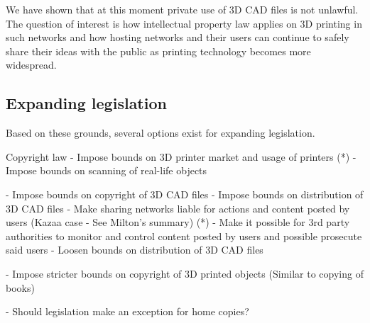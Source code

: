 We have shown that at this moment private use of 3D CAD files is not unlawful.
The question of interest is how intellectual property law applies on 3D printing
 in such networks and how hosting networks and their users can continue to 
 safely share their ideas with the public as printing technology becomes more 
widespread.

\subsection{Expanding legislation}
Based on these grounds, several options exist for expanding legislation.

Copyright law
- Impose bounds on 3D printer market and usage of printers (*)
- Impose bounds on scanning of real-life objects

- Impose bounds on copyright of 3D CAD files 
- Impose bounds on distribution of 3D CAD files
	- Make sharing networks liable for actions and content posted by users (Kazaa case - See Milton’s summary) (*)
	- Make it possible for 3rd party authorities to monitor and control content posted by users and possible prosecute said users
- Loosen bounds on distribution of 3D CAD files

- Impose stricter bounds on copyright of 3D printed objects (Similar to copying of books)

- Should legislation make an exception for home copies?
